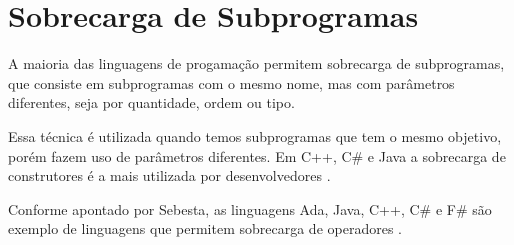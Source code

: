 \section{Sobrecarga de Subprogramas} %
\label{sec:sobrecarga_de_subprogramas}
A maioria das linguagens de progamação permitem sobrecarga de subprogramas, que consiste em subprogramas com o mesmo nome, mas com parâmetros diferentes, seja por quantidade, ordem ou tipo.

Essa técnica é utilizada quando temos subprogramas que tem o mesmo objetivo, porém fazem uso de parâmetros diferentes. Em C++, C\# e Java a sobrecarga de construtores é a mais utilizada por desenvolvedores \cite{overload_java}.

Conforme apontado por Sebesta, as linguagens Ada, Java, C++, C\# e F\# são exemplo de linguagens que permitem sobrecarga de operadores \cite{sebesta}.
